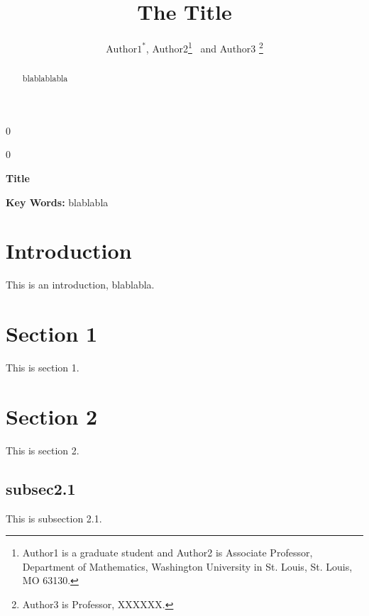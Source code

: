 \documentclass[12pt]{article}
\newcommand{\blind}{0}
\begin{document}
%

\def\spacingset#1{\renewcommand{\baselinestretch}%
{#1}\small\normalsize} \spacingset{1}



\blind
{
  \title{\bf The Title}
  \author{$\mbox{Author1}^*$, Author2\thanks{Author1 is a graduate student and Author2 is Associate Professor, Department of Mathematics, Washington University in St. Louis, St. Louis, MO 63130.}
    \ and
    Author3 \thanks{Author3 is Professor, XXXXXX.}\\}
  \date{\vspace{-5ex}}
  \maketitle
} \fi

\blind
{
  \bigskip
  \bigskip
  \bigskip
  \begin{center}
    {\LARGE\bf Title}
\end{center}
  \medskip
} \fi
\vspace{-3.5ex}
\begin{abstract}
blablablabla
\end{abstract}

\noindent%
\textbf{Key Words:} blablabla
\bigskip
\spacingset{1.40} %
\section{Introduction}
\label{sec:intro}

This is an introduction, blablabla.
\section{Section 1}
\label{sec:sec1}
This is section 1.
\section{Section 2}
\label{sec:sec2}
This is section 2.
\subsection{subsec2.1}
This is subsection 2.1.
\end{document}
